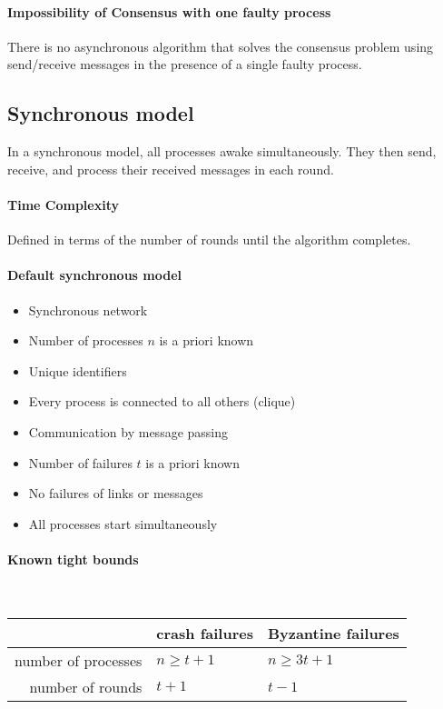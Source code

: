 \documentclass{idc_msc}
\begin{document}
\paragraph{Impossibility of Consensus with one faulty process}
There is no asynchronous algorithm that solves the consensus problem using send/receive messages in the presence of a single faulty process.

\subsection{Synchronous model}
In a synchronous model, all processes awake simultaneously.
They then send, receive, and process their received messages in each round.

\paragraph{Time Complexity}
Defined in terms of the number of rounds until the algorithm completes.

\paragraph{Default synchronous model}

\begin{itemize}
  \item Synchronous network
  \item Number of processes $n$ is a priori known
  \item Unique identifiers
  \item Every process is connected to all others (clique)
  \item Communication by message passing
  \item Number of failures $t$ is a priori known
  \item No failures of links or messages
  \item All processes start simultaneously
\end{itemize}

\paragraph{Known tight bounds}\ \\

\begin{tabu} to \linewidth{|r|l|l|}
\hline
 & crash failures & Byzantine failures \\
\hline
number of processes & $n \ge t + 1$ & $n \ge 3t +1$ \\
\hline
number of rounds & $t + 1$ & $t - 1$ \\
\hline
\end{tabu}
\end{document}
